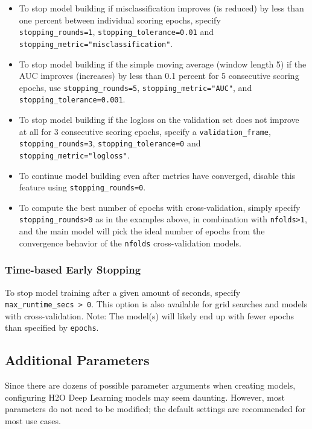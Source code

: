 {\begin{itemize}
\item To stop model building if misclassification improves (is reduced) by less than one percent between individual scoring epochs, specify \\\texttt{stopping\_rounds=1}, \texttt{stopping\_tolerance=0.01} and \\\texttt{stopping\_metric="misclassification"}.
\item To stop model building if the simple moving average (window length 5) if the AUC improves (increases) by less than 0.1 percent for 5 consecutive scoring epochs, use \texttt{stopping\_rounds=5},  \texttt{stopping\_metric="AUC"}, and  \texttt{stopping\_tolerance=0.001}.
\item To stop model building if the logloss on the validation set does not improve at all for 3 consecutive scoring epochs, specify a \texttt{validation\_frame}, \texttt{stopping\_rounds=3}, \texttt{stopping\_tolerance=0} and \\\texttt{stopping\_metric="logloss"}.
\item To continue model building even after metrics have converged, disable this feature using \texttt{stopping\_rounds=0}.
\item To compute the best number of epochs with cross-validation, simply specify \texttt{stopping\_rounds>0} as in the examples above, in combination with \texttt{nfolds>1}, and the main model will pick the ideal number of epochs from the convergence behavior of the \texttt{nfolds} cross-validation models.
\end{itemize}

\subsubsection{Time-based Early Stopping}
To stop model training after a given amount of seconds, specify \texttt{max\_runtime\_secs > 0}. This option is also available for grid searches and models with cross-validation. Note: The model(s) will likely end up with fewer epochs than specified by \texttt{epochs}.

\subsection{Additional Parameters} 

Since there are dozens of possible parameter arguments when creating models, configuring H2O Deep Learning models may seem daunting. However, most parameters do not need to be modified; the default settings are recommended for most use cases. 

}
